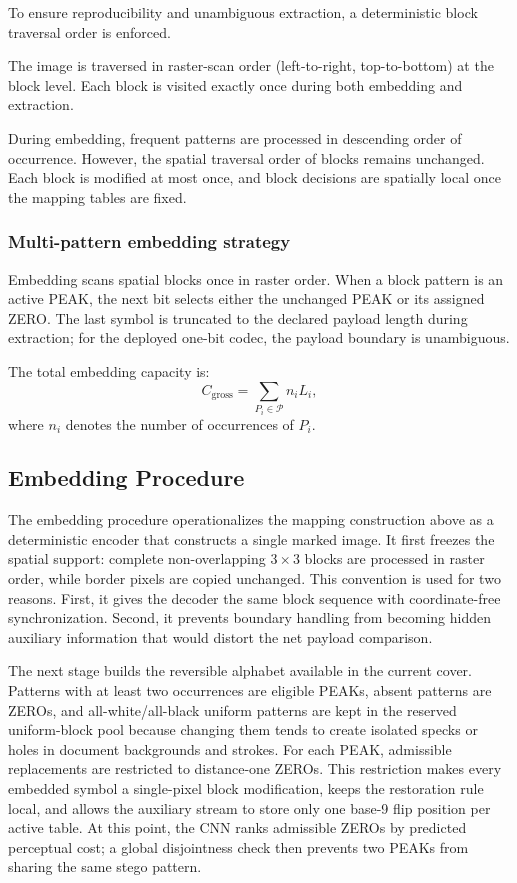 \documentclass[a4paper,fleqn]{cas-dc}
\newcommand{\RevisionAddBegin}{\begingroup}
\newcommand{\RevisionAddEnd}{\endgroup}
\newcommand{\RevisionAddBegin}{\begingroup\color{revisionblue}}
\newcommand{\RevisionAddEnd}{\endgroup}
\begin{document}
To ensure reproducibility and unambiguous extraction, a deterministic block traversal order is enforced.

The image is traversed in raster-scan order (left-to-right, top-to-bottom) at the block level.
Each block is visited exactly once during both embedding and extraction.

During embedding, frequent patterns are processed in descending order of occurrence.
However, the spatial traversal order of blocks remains unchanged.
\RevisionAddBegin
Each block is modified at most once, and block decisions are spatially local
once the mapping tables are fixed.
\RevisionAddEnd

\subsubsection*{Multi-pattern embedding strategy}
\label{subsec:multi_pattern}

Embedding scans spatial blocks once in raster order. When a block pattern is
an active PEAK, the next bit selects either the unchanged PEAK or its assigned
ZERO. The last symbol is truncated to the declared payload length during
\RevisionAddBegin
extraction; for the deployed one-bit codec, the payload boundary is
unambiguous.
\RevisionAddEnd

The total embedding capacity is:
\begin{equation}
C_{\text{gross}} = \sum_{P_i \in \mathcal{P}} n_i L_i,
\label{eq:gross-capacity}
\end{equation}
where $n_i$ denotes the number of occurrences of $P_i$.

\subsection{Embedding Procedure}
\RevisionAddBegin
The embedding procedure operationalizes the mapping construction above as a
deterministic encoder that constructs a single marked image. It first freezes
the spatial support: complete non-overlapping $3\times3$ blocks are processed
in raster order, while border pixels are copied unchanged.
This convention is used for two reasons. First, it gives the decoder the same
block sequence with coordinate-free synchronization. Second, it prevents boundary
handling from becoming hidden auxiliary information that would distort the net
payload comparison.

The next stage builds the reversible alphabet available in the current cover.
Patterns with at least two occurrences are eligible PEAKs, absent patterns are
ZEROs, and all-white/all-black uniform patterns are kept in the reserved
uniform-block pool because changing them tends to create isolated specks or holes in
document backgrounds and strokes. For each PEAK, admissible replacements are
restricted to distance-one ZEROs. This restriction makes every embedded symbol a
single-pixel block modification, keeps the restoration rule local, and allows
the auxiliary stream to store only one base-9 flip position per active table.
At this point, the CNN ranks admissible ZEROs by predicted perceptual cost;
a global disjointness check then prevents two PEAKs from sharing the same
stego pattern.
\end{document}
